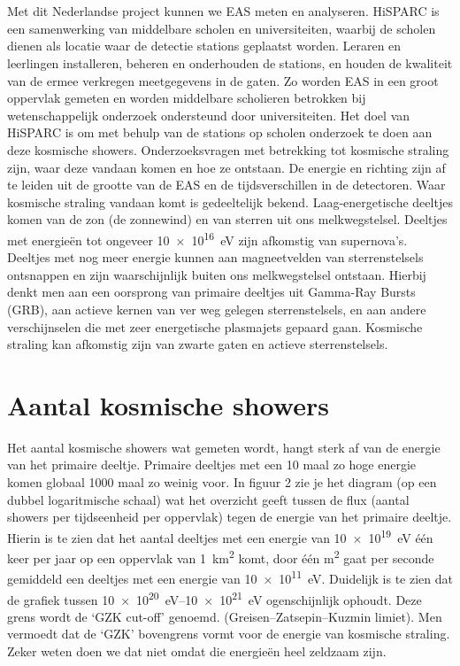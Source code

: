 \section{\hisparc}

Met dit Nederlandse project kunnen we EAS meten en analyseren. HiSPARC
is een samenwerking van middelbare scholen en universiteiten, waarbij de
scholen dienen als locatie waar de detectie stations geplaatst worden.
Leraren en leerlingen installeren, beheren en onderhouden de stations,
en houden de kwaliteit van de ermee verkregen meetgegevens in de gaten.
Zo worden EAS in een groot oppervlak gemeten en worden middelbare
scholieren betrokken bij wetenschappelijk onderzoek ondersteund door
universiteiten. Het doel van HiSPARC is om met behulp van de stations op
scholen onderzoek te doen aan deze kosmische showers. Onderzoeksvragen
met betrekking tot kosmische straling zijn, waar deze vandaan komen en
hoe ze ontstaan. De energie en richting zijn af te leiden uit de grootte
van de EAS en de tijdsverschillen in de detectoren. Waar kosmische
straling vandaan komt is gedeeltelijk bekend. Laag-energetische deeltjes
komen van de zon (de zonnewind) en van sterren uit ons melkwegstelsel.
Deeltjes met energieën tot ongeveer \SI{10e16}{\electronvolt} zijn
afkomstig van supernova's. Deeltjes met nog meer energie kunnen aan
magneetvelden van sterrenstelsels ontsnappen en zijn waarschijnlijk
buiten ons melkwegstelsel ontstaan. Hierbij denkt men aan een oorsprong
van primaire deeltjes uit Gamma-Ray Bursts (GRB), aan actieve kernen van
ver weg gelegen sterrenstelsels, en aan andere verschijnselen die met
zeer energetische plasmajets gepaard gaan. Kosmische straling kan
afkomstig zijn van zwarte gaten en actieve sterrenstelsels.

\section{Aantal kosmische showers}

Het aantal kosmische showers wat gemeten wordt, hangt sterk af van de
energie van het primaire deeltje. Primaire deeltjes met een 10 maal zo
hoge energie komen globaal 1000 maal zo weinig voor. In figuur 2 zie je
het diagram (op een dubbel logaritmische schaal) wat het overzicht geeft
tussen de flux (aantal showers per tijdseenheid per oppervlak) tegen de
energie van het primaire deeltje. Hierin is te zien dat het aantal
deeltjes met een energie van \SI{10e19}{\electronvolt} één keer per jaar
op een oppervlak van \SI{1}{\square\kilo\meter} komt, door één \si{\square\meter}
gaat per seconde gemiddeld een deeltjes met een energie van
\SI{10e11}{\electronvolt}. Duidelijk is te zien dat de grafiek tussen
\SIrange{10e20}{10e21}{\electronvolt} ogenschijnlijk ophoudt. Deze grens
wordt de ‘GZK cut-off’ genoemd. (Greisen–Zatsepin–Kuzmin limiet). Men
vermoedt dat de ‘GZK’ bovengrens vormt voor de energie van kosmische
straling. Zeker weten doen we dat niet omdat die energieën heel zeldzaam
zijn.

